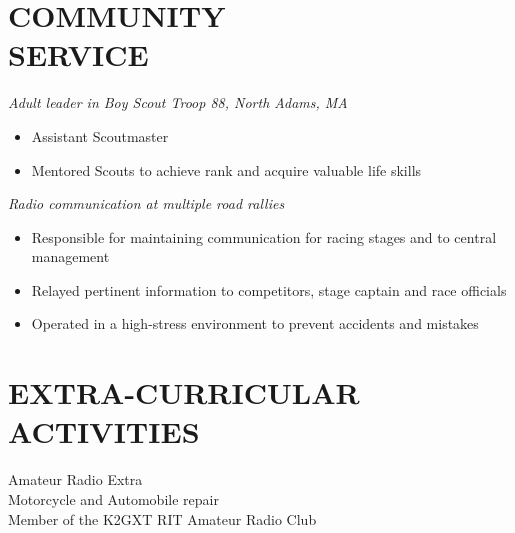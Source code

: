 \documentclass[line,margin]{res}
\begin{document}
\begin{resume}
\section{COMMUNITY \\ SERVICE}  
{\sl	Adult leader in Boy Scout Troop 88, North Adams, MA}
	\begin{itemize}  \itemsep -2pt %
		\item Assistant Scoutmaster
		\item Mentored Scouts to achieve rank and acquire valuable life skills%
	\end{itemize}
	\vspace{-5pt}
	{\sl	Radio communication at multiple road rallies}
	\begin{itemize}  \itemsep -2pt %
		\item Responsible for maintaining communication for racing stages and to central management
		\item Relayed pertinent information to competitors, stage captain and race officials
		\item Operated in a high-stress environment to prevent accidents and mistakes		
	\end{itemize}

\section{EXTRA-CURRICULAR \\ ACTIVITIES}             
	Amateur Radio Extra\\
	Motorcycle and Automobile repair\\
	Member of the K2GXT RIT Amateur Radio Club\\


\end{resume}
\end{document}

